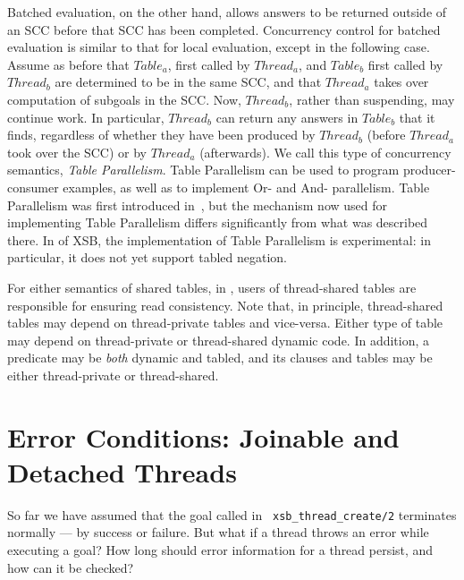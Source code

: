 Batched evaluation, on the other hand, allows answers to be returned
outside of an SCC before that SCC has been completed.  Concurrency
control for batched evaluation is similar to that for local
evaluation, except in the following case.  Assume as before that
$Table_a$, first called by $Thread_a$, and $Table_b$ first called by
$Thread_b$ are determined to be in the same SCC, and that $Thread_a$
takes over computation of subgoals in the SCC.  Now, $Thread_b$,
rather than suspending, may continue work.  In particular, $Thread_b$
can return any answers in $Table_b$ that it finds, regardless of
whether they have been produced by $Thread_b$ (before $Thread_a$ took
over the SCC) or by $Thread_a$ (afterwards).  We call this type of
concurrency semantics, {\em Table Parallelism}.  Table Parallelism can
be used to program producer-consumer examples, as well as to implement
Or- and And- parallelism.  Table Parallelism was first introduced
in~\cite{FHSW95}, but the mechanism now used for implementing Table
Parallelism differs significantly from what was described there.  In
\version{} of XSB, the implementation of Table Parallelism is
experimental: in particular, it does not yet support tabled negation.

For either semantics of shared tables, in \version{}, users of
thread-shared tables are responsible for ensuring read consistency.
Note that, in principle, thread-shared tables may depend on
thread-private tables and vice-versa.  Either type of table may depend
on thread-private or thread-shared dynamic code.  In addition, a
predicate may be {\em both} dynamic and tabled, and its clauses and
tables may be either thread-private or thread-shared.

\section{Error Conditions: Joinable and Detached Threads}

So far we have assumed that the goal called in {\tt
  xsb\_thread\_create/2} terminates normally --- by success or
failure.  But what if a thread throws an error while executing a goal?
How long should error information for a thread persist, and how can it
be checked?

